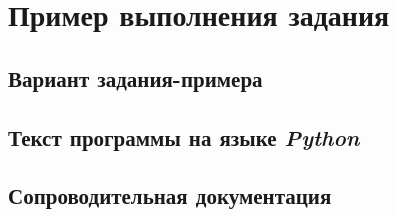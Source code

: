 \chapter{Пример выполнения задания}

\section{Вариант задания-примера}

\section{Текст программы на языке \textit{Python}}

\section{Сопроводительная документация}

